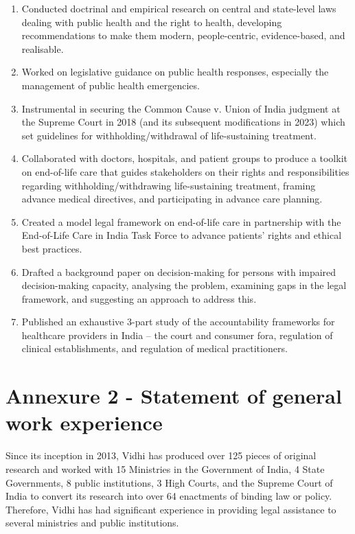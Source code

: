 \documentclass[a4paper,11pt]{article}
\begin{document}
    \begin{enumerate}
        \item Conducted doctrinal and empirical research on central and state-level laws dealing with public health and the right to health, developing recommendations to make them modern, people-centric, evidence-based, and realisable. 
        \item Worked on legislative guidance on public health responses, especially the management of public health emergencies.
        \item Instrumental in securing the Common Cause v. Union of India judgment at the Supreme Court in 2018 (and its subsequent modifications in 2023) which set guidelines for withholding/withdrawal of life-sustaining treatment.
        \item Collaborated with doctors, hospitals, and patient groups to produce a toolkit on end-of-life care that guides stakeholders on their rights and responsibilities regarding withholding/withdrawing life-sustaining treatment, framing advance medical directives, and participating in advance care planning.
        \item Created a model legal framework on end-of-life care in partnership with the End-of-Life Care in India Task Force to advance patients' rights and ethical best practices. 
        \item Drafted a background paper on decision-making for persons with impaired decision-making capacity, analysing the problem, examining gaps in the legal framework, and suggesting an approach to address this.
        \item Published an exhaustive 3-part study of the accountability frameworks for healthcare providers in India – the court and consumer fora, regulation of clinical establishments, and regulation of medical practitioners.

    \end{enumerate}


\section{Annexure 2 - Statement of general work experience}
Since its inception in 2013, Vidhi has produced over 125 pieces of original research and worked with 15 Ministries in the Government of India, 4 State Governments, 8 public institutions, 3 High Courts, and the Supreme Court of India to convert its research into over 64 enactments of binding law or policy. Therefore, Vidhi has had significant experience in providing legal assistance to several ministries and public institutions. 
\end{document}
